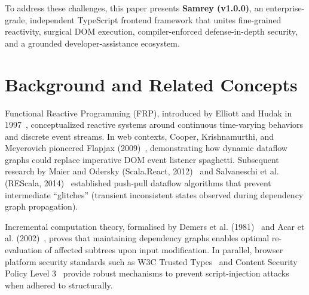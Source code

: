 \documentclass[10pt,journal,compsoc]{IEEEtran}
\begin{document}
To address these challenges, this paper presents \textbf{Samrey (v1.0.0)}, an enterprise-grade, independent TypeScript frontend framework that unites fine-grained reactivity, surgical DOM execution, compiler-enforced defense-in-depth security, and a grounded developer-assistance ecosystem.

\section{Background and Related Concepts}
Functional Reactive Programming (FRP), introduced by Elliott and Hudak in 1997~\cite{elliott1997functional}, conceptualized reactive systems around continuous time-varying behaviors and discrete event streams. In web contexts, Cooper, Krishnamurthi, and Meyerovich pioneered Flapjax (2009)~\cite{meyerovich2009flapjax}, demonstrating how dynamic dataflow graphs could replace imperative DOM event listener spaghetti. Subsequent research by Maier and Odersky (Scala.React, 2012)~\cite{maier2012deprecating} and Salvaneschi et al. (REScala, 2014)~\cite{salvaneschi2014rescala} established push-pull dataflow algorithms that prevent intermediate ``glitches'' (transient inconsistent states observed during dependency graph propagation).

Incremental computation theory, formalised by Demers et al. (1981)~\cite{demers1981incremental} and Acar et al. (2002)~\cite{acar2002adaptive}, proves that maintaining dependency graphs enables optimal re-evaluation of affected subtrees upon input modification. In parallel, browser platform security standards such as W3C Trusted Types~\cite{w3c_trusted_types} and Content Security Policy Level 3~\cite{w3c_csp3} provide robust mechanisms to prevent script-injection attacks when adhered to structurally.
\end{document}
